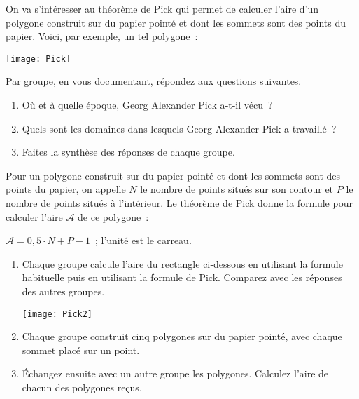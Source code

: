 
\begin{TP}

On va s'intéresser au théorème de Pick qui permet de calculer l'aire d'un polygone construit sur du papier pointé et dont les sommets sont des points du papier. Voici, par exemple, un tel polygone :
\begin{center} \texttt{[image: Pick]} \end{center}

Par groupe, en vous documentant, répondez aux questions suivantes.
\begin{enumerate}
 \item Où et à quelle époque, Georg Alexander Pick a‑t‑il vécu ?
 \item Quels sont les domaines dans lesquels Georg Alexander Pick a travaillé ?
 \item Faites la synthèse des réponses de chaque groupe.
\end{enumerate}

Pour un polygone construit sur du papier pointé et dont les sommets sont des points du papier, on appelle $N$ le nombre de points situés sur son contour et $P$ le nombre de points situés à l'intérieur. Le théorème de Pick donne la formule pour calculer l'aire $\mathcal{A}$ de ce polygone :
\begin{center} $\mathcal{A} = 0,5 \cdot N + P - 1$ ; l'unité est le carreau. \end{center}
\begin{enumerate}
 \item Chaque groupe calcule l'aire du rectangle ci‑dessous en utilisant la formule habituelle puis en utilisant la formule de Pick. Comparez avec les réponses des autres groupes. \\[1em]
\begin{center} \texttt{[image: Pick2]} \end{center}

 \item Chaque groupe construit cinq polygones sur du papier pointé, avec chaque sommet placé sur un point.
 \item Échangez ensuite avec un autre groupe les polygones. Calculez l'aire de chacun des polygones reçus.
 \end{enumerate}
\end{TP}

